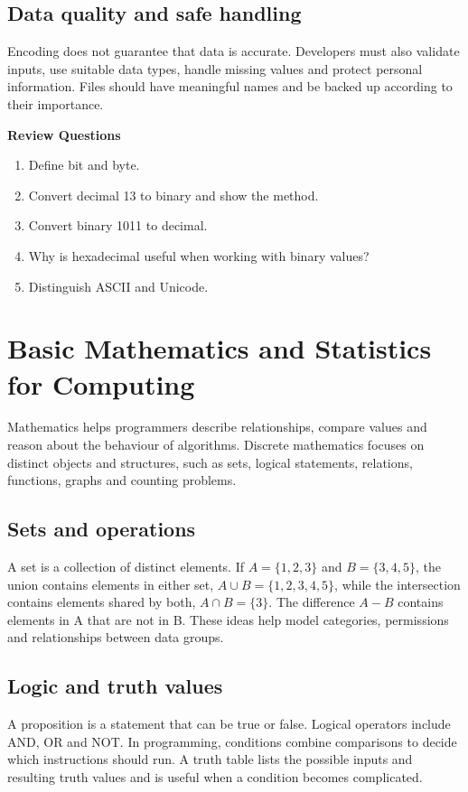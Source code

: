\documentclass[11pt,openany,oneside]{book}
\newcommand{\reviewtitle}{\par\noindent\textbf{\color{Navy}Review Questions}\par}
\begin{document}
\section{Data quality and safe handling}
Encoding does not guarantee that data is accurate. Developers must also validate inputs, use suitable data types, handle missing values and protect personal information. Files should have meaningful names and be backed up according to their importance.

\reviewtitle
\begin{enumerate}
\item Define bit and byte.
\item Convert decimal 13 to binary and show the method.
\item Convert binary 1011 to decimal.
\item Why is hexadecimal useful when working with binary values?
\item Distinguish ASCII and Unicode.
\end{enumerate}

\chapter{Basic Mathematics and Statistics for Computing}
Mathematics helps programmers describe relationships, compare values and reason about the behaviour of algorithms. Discrete mathematics focuses on distinct objects and structures, such as sets, logical statements, relations, functions, graphs and counting problems.

\section{Sets and operations}
A set is a collection of distinct elements. If \(A=\{1,2,3\}\) and \(B=\{3,4,5\}\), the union contains elements in either set, \(A\cup B=\{1,2,3,4,5\}\), while the intersection contains elements shared by both, \(A\cap B=\{3\}\). The difference \(A-B\) contains elements in A that are not in B. These ideas help model categories, permissions and relationships between data groups.

\section{Logic and truth values}
A proposition is a statement that can be true or false. Logical operators include AND, OR and NOT. In programming, conditions combine comparisons to decide which instructions should run. A truth table lists the possible inputs and resulting truth values and is useful when a condition becomes complicated.
\end{document}
